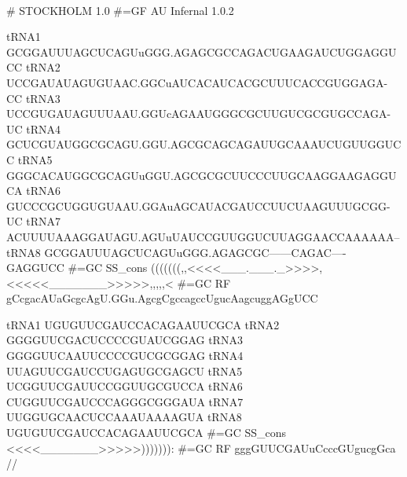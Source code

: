 {\samepage
{}\\

\begin{sreoutput}

# STOCKHOLM 1.0
#=GF AU Infernal 1.0.2

tRNA1        GCGGAUUUAGCUCAGUuGGG.AGAGCGCCAGACUGAAGAUCUGGAGGUCC
tRNA2        UCCGAUAUAGUGUAAC.GGCuAUCACAUCACGCUUUCACCGUGGAGA-CC
tRNA3        UCCGUGAUAGUUUAAU.GGUcAGAAUGGGCGCUUGUCGCGUGCCAGA-UC
tRNA4        GCUCGUAUGGCGCAGU.GGU.AGCGCAGCAGAUUGCAAAUCUGUUGGUCC
tRNA5        GGGCACAUGGCGCAGUuGGU.AGCGCGCUUCCCUUGCAAGGAAGAGGUCA
tRNA6        GUCCCGCUGGUGUAAU.GGAuAGCAUACGAUCCUUCUAAGUUUGCGG-UC
tRNA7        ACUUUUAAAGGAUAGU.AGUuUAUCCGUUGGUCUUAGGAACCAAAAAA--
tRNA8        GCGGAUUUAGCUCAGUuGGG.AGAGCGC------CAGAC----GAGGUCC
#=GC SS_cons (((((((,,<<<<___.___._>>>>,<<<<<_______>>>>>,,,,,<
#=GC RF      gCcgacAUaGcgcAgU.GGu.AgcgCgccagccUgucAagcuggAGgUCC

tRNA1        UGUGUUCGAUCCACAGAAUUCGCA
tRNA2        GGGGUUCGACUCCCCGUAUCGGAG
tRNA3        GGGGUUCAAUUCCCCGUCGCGGAG
tRNA4        UUAGUUCGAUCCUGAGUGCGAGCU
tRNA5        UCGGUUCGAUUCCGGUUGCGUCCA
tRNA6        CUGGUUCGAUCCCAGGGCGGGAUA
tRNA7        UUGGUGCAACUCCAAAUAAAAGUA
tRNA8        UGUGUUCGAUCCACAGAAUUCGCA
#=GC SS_cons <<<<_______>>>>>))))))):
#=GC RF      gggGUUCGAUuCcccGUgucgGca
//
\end{sreoutput}
}

